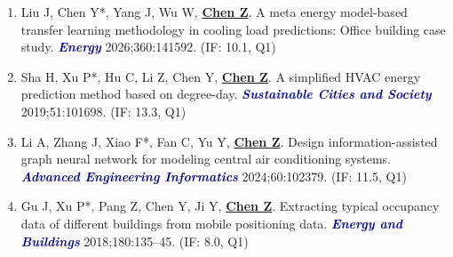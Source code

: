 \documentclass[11pt,a4paper]{article}
\newcommand{\me}[1]{\underline{\textbf{#1}}}
\newcommand{\journal}[1]{\textcolor{darkblue}{\textbf{\textit{#1}}}}
\begin{document}
\begin{enumerate}
\item Liu J, Chen Y*, Yang J, Wu W, \me{Chen Z}. A meta energy model-based transfer learning methodology in cooling load predictions: Office building case study. \journal{Energy} 2026;360:141592. (IF: 10.1, Q1)
\item Sha H, Xu P*, Hu C, Li Z, Chen Y, \me{Chen Z}. A simplified HVAC energy prediction method based on degree-day. \journal{Sustainable Cities and Society} 2019;51:101698. (IF: 13.3, Q1)
\item Li A, Zhang J, Xiao F*, Fan C, Yu Y, \me{Chen Z}. Design information-assisted graph neural network for modeling central air conditioning systems. \journal{Advanced Engineering Informatics} 2024;60:102379. (IF: 11.5, Q1)
\item Gu J, Xu P*, Pang Z, Chen Y, Ji Y, \me{Chen Z}. Extracting typical occupancy data of different buildings from mobile positioning data. \journal{Energy and Buildings} 2018;180:135--45. (IF: 8.0, Q1)
\end{enumerate}
\end{document}
